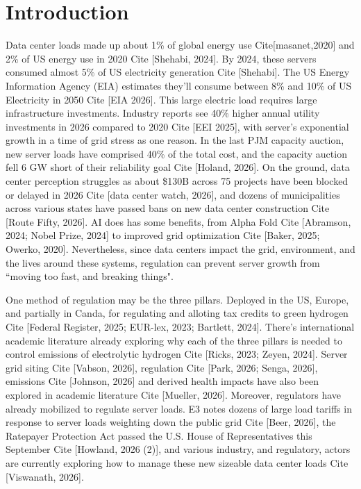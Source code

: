 \documentclass{iopjournal}
\begin{document}
\section{Introduction}
Data center loads made up about 1\% of global energy use Cite[masanet,2020] and 2\% of US energy use in 2020 Cite [Shehabi, 2024]. By 2024, these servers consumed almost 5\% of US electricity generation Cite [Shehabi]. The US Energy Information Agency (EIA) estimates they'll consume between 8\% and 10\% of US Electricity in 2050 Cite [EIA 2026]. This large electric load requires large infrastructure investments. Industry reports see 40\% higher annual utility investments in 2026 compared to 2020 Cite [EEI 2025], with server's exponential growth in a time of grid stress as one reason. In the last PJM capacity auction, new server loads have comprised 40\% of the total cost, and the capacity auction fell 6 GW short of their reliability goal Cite [Holand, 2026]. On the ground, data center perception struggles as about \$130B across 75 projects  have been blocked or delayed in 2026 Cite [data center watch, 2026], and dozens of municipalities across various states have passed bans on new data center construction Cite [Route Fifty, 2026]. AI does has some benefits, from Alpha Fold Cite [Abramson, 2024; Nobel Prize, 2024] to improved grid optimization Cite [Baker, 2025; Owerko, 2020]. Nevertheless, since data centers impact the grid, environment, and the lives around these systems, regulation can prevent server growth from ``moving too fast, and breaking things". 

One method of regulation may be the three pillars. Deployed in the US,  Europe, and partially in Canda, for regulating and alloting tax credits to green hydrogen Cite [Federal Register, 2025; EUR-lex, 2023; Bartlett, 2024]. There's international academic literature already exploring why each of the three pillars is needed to control emissions of electrolytic hydrogen Cite [Ricks, 2023; Zeyen, 2024]. Server grid siting Cite [Vabson, 2026], regulation Cite [Park, 2026; Senga, 2026], emissions Cite [Johnson, 2026] and derived health impacts have also been explored in academic literature Cite [Mueller, 2026]. Moreover, regulators have already mobilized to regulate server loads. E3 notes dozens of large load tariffs in response to server loads weighting down the public grid Cite [Beer, 2026], the Ratepayer Protection Act passed the U.S. House of Representatives this September Cite [Howland, 2026 (2)], and various industry, and regulatory, actors are currently exploring how to manage these new sizeable data center loads Cite [Viswanath, 2026].
\end{document}
